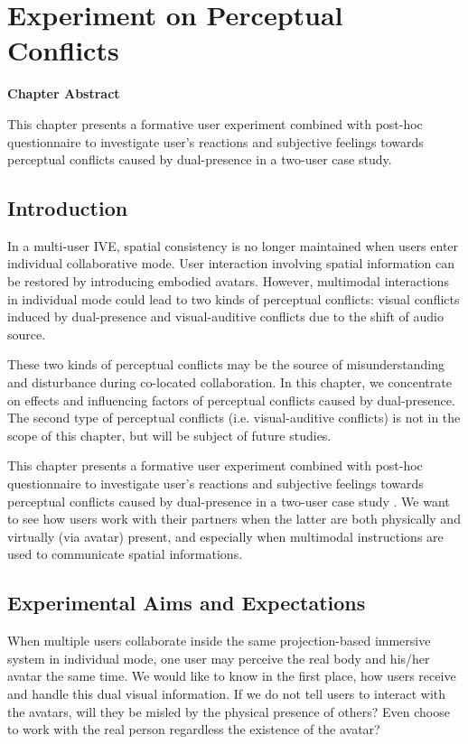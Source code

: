 \chapter{Experiment on Perceptual Conflicts}
\label{chapter:expe_perception}
\pagebreak

\textbf{Chapter Abstract}

This chapter presents a formative user experiment combined with post-hoc questionnaire to investigate user's reactions and subjective feelings towards perceptual conflicts caused by dual-presence in a two-user case study.

\vspace*{2\baselineskip}

\minitoc

\newpage
\section{Introduction}
In a multi-user IVE, spatial consistency is no longer maintained when users enter individual collaborative mode. User interaction involving spatial information can be restored by introducing embodied avatars. However, multimodal interactions in individual mode could lead to two kinds of perceptual conflicts: visual conflicts induced by dual-presence and visual-auditive conflicts due to the shift of audio source.

These two kinds of perceptual conflicts may be the source of misunderstanding and disturbance during co-located collaboration. In this chapter, we concentrate on effects and influencing factors of perceptual conflicts caused by dual-presence. The second type of perceptual conflicts (i.e. visual-auditive conflicts) is not in the scope of this chapter, but will be subject of future studies.

This chapter presents a formative user experiment combined with post-hoc questionnaire to investigate user's reactions and subjective feelings towards perceptual conflicts caused by dual-presence in a two-user case study \citep{Chen2014PCM}. We want to see how users work with their partners when the latter are both physically and virtually (via avatar) present, and especially when multimodal instructions are used to communicate spatial informations.


\section{Experimental Aims and Expectations}
When multiple users collaborate inside the same projection-based immersive system in individual mode, one user may perceive the real body and his/her avatar the same time. We would like to know in the first place, how users receive and handle this dual visual information. If we do not tell users to interact with the avatars, will they be misled by the physical presence of others? Even choose to work with the real person regardless the existence of the avatar?


